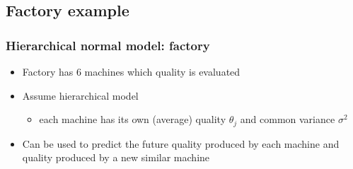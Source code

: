 \documentclass[10pt]{beamer}
\begin{document}
\begin{frame}


\end{frame}

\subsection{Factory example}

\begin{frame}

\frametitle{Hierarchical normal model: factory}

  \begin{itemize}
  \item Factory has 6 machines which quality is evaluated
  \item Assume hierarchical model
    \begin{itemize}
    \item each machine has its own (average) quality $\theta_j$ and
      {\color{uured} common variance} $\sigma^2$
    \end{itemize}
\begin{minipage}[b]{4cm}
\begin{xy}
\end{xy}
    \end{minipage}
  \item Can be used to predict the future quality produced by each machine and quality produced by a new similar machine
  \end{itemize}
\end{frame}
\end{document}
